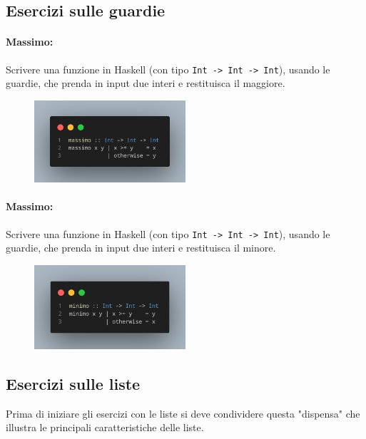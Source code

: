 \subsection{Esercizi sulle guardie}

\paragraph{Massimo:} Scrivere una funzione in Haskell (con tipo \texttt{Int -> Int -> Int}), usando 
le guardie, che
prenda in input due interi e restituisca il maggiore.

\begin{figure}[!h]
    \centering
    \includegraphics[width=0.5\textwidth]{images/Massimo.png}
\end{figure}

\paragraph{Massimo:} Scrivere una funzione in Haskell (con tipo \texttt{Int -> Int -> Int}), usando 
le guardie, che
prenda in input due interi e restituisca il minore.

\begin{figure}[!h]
    \centering
    \includegraphics[width=0.5\textwidth]{images/Minimo.png}
\end{figure}

\pagebreak

\subsection{Esercizi sulle liste}

Prima di iniziare gli esercizi con le liste si deve condividere questa "dispensa"
che illustra le principali caratteristiche delle liste.

